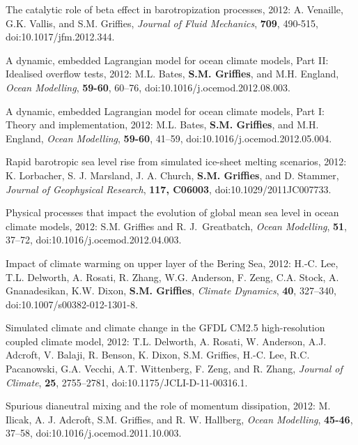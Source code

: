\begin{etaremune}
\item The catalytic role of beta effect in barotropization processes,
  2012: A. Venaille, G.K. Vallis, and S.M. Grif\/f\/ies, {\it
    Journal of Fluid Mechanics}, {\bf 709}, 490-515,
  doi:10.1017/jfm.2012.344.

\item A dynamic, embedded Lagrangian model for ocean climate models,
  Part II: Idealised overflow tests, 2012: M.L. Bates, {\bf
    S.M. Grif\/f\/ies}, and M.H. England, {\it Ocean Modelling}, {\bf
    59-60}, 60--76, doi:10.1016/j.ocemod.2012.08.003.

\item A dynamic, embedded Lagrangian model for ocean climate models,
  Part I: Theory and implementation, 2012: M.L. Bates, {\bf
    S.M. Grif\/f\/ies}, and M.H. England, {\it Ocean Modelling}, {\bf
    59-60}, 41--59, doi:10.1016/j.ocemod.2012.05.004.

\item Rapid barotropic sea level rise from simulated ice-sheet melting
  scenarios, 2012: K. Lorbacher, S. J. Marsland, J. A. Church, {\bf
    S.M. Grif\/f\/ies}, and D. Stammer, {\it Journal of Geophysical
    Research}, {\bf 117, C06003}, doi:10.1029/2011JC007733.

\item Physical processes that impact the evolution of global mean sea
  level in ocean climate models, 2012: S.M. Grif\/f\/ies and R. J.\
  Greatbatch, {\it Ocean Modelling}, {\bf 51}, 37--72,
  doi:10.1016/j.ocemod.2012.04.003.

\item Impact of climate warming on upper layer of the Bering Sea,
  2012: H.-C. Lee, T.L. Delworth, A. Rosati, R. Zhang, W.G. Anderson,
  F. Zeng, C.A. Stock, A. Gnanadesikan, K.W. Dixon, {\bf
    S.M. Grif\/f\/ies}, {\it Climate Dynamics}, {\bf 40}, 327–340,
  doi:10.1007/s00382-012-1301-8.

\item Simulated climate and climate change in the GFDL CM2.5
  high-resolution coupled climate model, 2012: T.L. Delworth,
  A. Rosati, W. Anderson, A.J. Adcroft, V. Balaji, R. Benson,
  K. Dixon, S.M. Grif\/f\/ies, H.-C. Lee, R.C. Pacanowski,
  G.A. Vecchi, A.T. Wittenberg, F. Zeng, and R. Zhang, {\it Journal of
    Climate}, {\bf 25}, 2755--2781, doi:10.1175/JCLI-D-11-00316.1.

\item Spurious dianeutral mixing and the role of momentum dissipation, 2012: M. Ilicak, A. J. Adcroft, S.M. Grif\/f\/ies, and
  R. W. Hallberg, {\it Ocean Modelling}, {\bf 45-46}, 37--58,
  doi:10.1016/j.ocemod.2011.10.003.


\end{etaremune}
